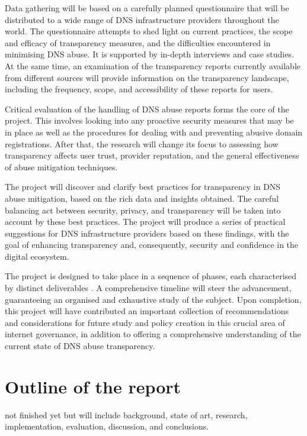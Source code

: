 Data gathering will be based on a carefully planned questionnaire that will be distributed to a wide range of DNS infrastructure providers throughout the world. The questionnaire attempts to shed light on current practices, the scope and efficacy of transparency measures, and the difficulties encountered in minimising DNS abuse. It is supported by in-depth interviews and case studies. At the same time, an examination of the transparency reports currently available from different sources will provide information on the transparency landscape, including the frequency, scope, and accessibility of these reports for users.

Critical evaluation of the handling of DNS abuse reports forms the core of the project. This involves looking into any proactive security measures that may be in place as well as the procedures for dealing with and preventing abusive domain registrations. After that, the research will change its focus to assessing how transparency affects user trust, provider reputation, and the general effectiveness of abuse mitigation techniques.

The project will discover and clarify best practices for transparency in DNS abuse mitigation, based on the rich data and insights obtained. The careful balancing act between security, privacy, and transparency will be taken into account by these best practices. The project will produce a series of practical suggestions for DNS infrastructure providers based on these findings, with the goal of enhancing transparency and, consequently, security and confidence in the digital ecosystem.

The project is designed to take place in a sequence of phases, each characterised by distinct deliverables . A comprehensive timeline will steer the advancement, guaranteeing an organised and exhaustive study of the subject. Upon completion, this project will have contributed an important collection of recommendations and considerations for future study and policy creation in this crucial area of internet governance, in addition to offering a comprehensive understanding of the current state of DNS abuse transparency.

\section{Outline of the report}
not finished yet but will include background, state of art, research, implementation, evaluation, discussion, and conclusions. 